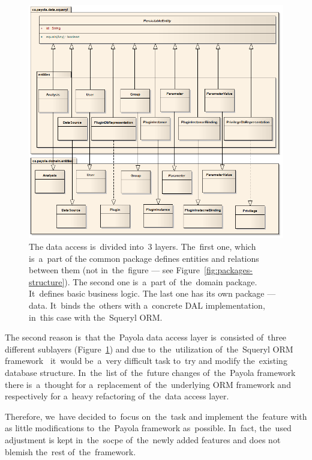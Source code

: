 \begin{figure}
	\centering
	\includegraphics[width=140mm]{img/data_entities.png}
	\caption{The data access is~divided into~3 layers. The~first one, which is~a~part of
	the common package defines entities and relations between them (not in~the~figure ---
	see Figure~\ref{fig:packages-structure}).
	The second one is~a~part of~the~domain package. It~defines basic business logic.
	The last one has its own package --- data. It~binds the~others with a~concrete DAL
	implementation, in~this case with the~Squeryl ORM. ~\cite{payola:dg}}
	\label{fig:3-layers}
\end{figure}

The second reason is~that the~Payola data access layer is~consisted of~three different sublayers
(Figure~\ref{fig:3-layers}) and 
due to~the~utilization of~the~Squeryl ORM framework~\cite{squeryl} it~would be~a~very difficult 
task to~try and modify the~existing database structure. In~the~list of~the~future changes of~the~Payola framework there is~a~thought for a~replacement of~the~underlying ORM framework
and respectively for a~heavy refactoring of~the~data access layer.

Therefore, we~have decided to~focus on~the~task and implement the~feature with 
as little modifications to~the~Payola framework as~possible. In~fact, the~used adjustment is
kept in~the~socpe of~the~newly added features and does not blemish the~rest of~the~framework.

